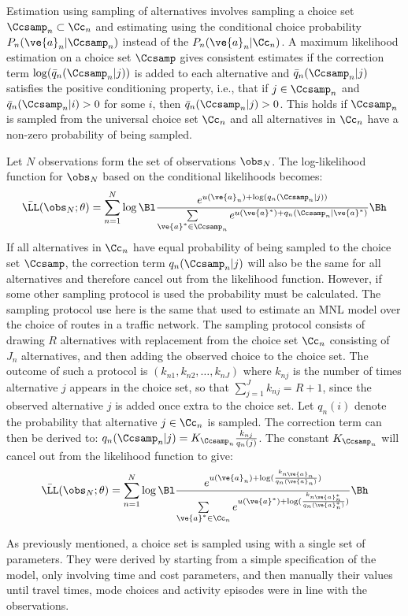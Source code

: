 Estimation using sampling of alternatives involves sampling a choice set $\Ccsamp_n \subset \Cc_n$ and estimating using the conditional choice probability $P_n(\ve{a}_n|\Ccsamp_n)$ instead of the $P_n(\ve{a}_n|\Cc_n)$. A maximum likelihood estimation on a choice set $\Ccsamp$ gives consistent estimates if the correction term $\log(\bar{q}_n(\Ccsamp_n|j))$ is added to each alternative and $\bar{q}_n(\Ccsamp_n|j)$ satisfies the positive conditioning property, i.e., that if $j\in \Ccsamp_n$ and $\bar{q}_n(\Ccsamp_n|i)>0$ for some $i$, then $\bar{q}_n(\Ccsamp_n|j)>0$. This holds if $\Ccsamp_n$ is sampled from the universal choice set $\Cc_n$ and all alternatives in $\Cc_n$ have a non-zero probability of being sampled.

Let $N$ observations form the set of observations $\obs_N$. The log-likelihood function for $\obs_N$ based on the conditional likelihoods becomes:
\begin{equation} \label{eq:cond_like}
\bar{\LL}(\obs_N;\theta) = \sum_{n=1}^N \log \Bl \frac{e^{u(\ve{a}_n) + \log(q_n(\Ccsamp_n|j))}}{\sum\limits_{\ve{a}^* \in \Ccsamp_n} e^{u(\ve{a}^*) + q_n(\Ccsamp_n|\ve{a}^*)}}\Bh
\end{equation}
If all alternatives in $\Cc_n$ have equal probability of being sampled to the choice set $\Ccsamp$, the correction term $q_n(\Ccsamp_n|j)$ will also be the same for all alternatives and therefore cancel out from the likelihood function. However, if some other sampling protocol is used the probability must be calculated. The sampling protocol use here is the same that \citet{frejinger09} used to estimate an MNL model over the choice of routes in a traffic network. The sampling protocol consists of drawing $R$ alternatives with replacement from the choice set $\Cc_n$ consisting of $J_n$ alternatives, and then adding the observed choice to the choice set. The outcome of such a protocol is $({k}_{n1},{k}_{n2},\dots,{k}_{nJ})$ where ${k}_{nj}$ is the number of times alternative $j$ appears in the choice set, so that $\sum_{j=1}^J {k}_{nj} = R+1$, since the observed alternative $j$ is added once extra to the choice set. Let $q_n(i)$ denote the probability that alternative $j \in \Cc_n$ is sampled. The correction term can then be derived to: $q_n(\Ccsamp_n|j) = K_{\Ccsamp_n}\frac{k_{nj}}{q_n(j)}$. The constant $K_{\Ccsamp_n}$ will cancel out from the likelihood function to give:
\begin{equation} \label{eq:cond_like_corr}
\bar{\LL}(\obs_N;\theta) = \sum_{n=1}^N \log \Bl \frac{e^{u(\ve{a}_n) + \log(\frac{k_{n\ve{a}_n}}{q_n(\ve{a}_n)})}}{\sum\limits_{\ve{a}^* \in \Cc_n} e^{u(\ve{a}^*) + \log(\frac{k_{n\ve{a}^*_n}}{q_n(\ve{a}^*_n)})}}\Bh
\end{equation}
 
As previously mentioned, a choice set is sampled using  with a single set of parameters. They were derived by starting from a simple specification of the model, only involving time and cost parameters, and then manually their values until travel times, mode choices and activity episodes were in line with the observations.

 
